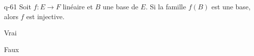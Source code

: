 \begin{truefalse}{q-61}
Soit $f : E \to F$ linéaire et $B$  une base de $E$. Si la famille $f(B)$ est une base, alors $f$ est injective.
\item* Vrai
\item Faux
\end{truefalse}

